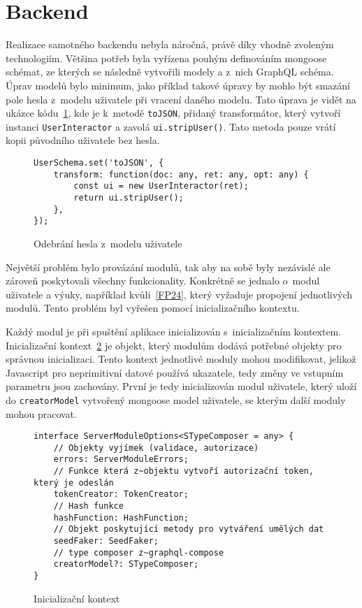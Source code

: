 \section{Backend}
\label{sc:backend}
Realizace samotného backendu nebyla náročná, právě díky vhodně zvoleným technologiím. Většina potřeb byla vyřízena pouhým definováním mongoose schémat, ze kterých se následně vytvořili modely a z~nich GraphQL schéma. Úprav modelů bylo minimum, jako příklad takové úpravy by mohlo být smazání pole hesla z~modelu uživatele při vracení daného modelu. Tato úprava je vidět na ukázce kódu~\ref{code:to_json_user}, kde je k~metodě \texttt{toJSON}, přidaný transformátor, který vytvoří instanci \texttt{UserInteractor} a zavolá \texttt{ui.stripUser()}. Tato metoda pouze vrátí kopii původního uživatele bez hesla.

\begin{figure}[h!]
    \centering
    \begin{verbatim}
UserSchema.set('toJSON', {
    transform: function(doc: any, ret: any, opt: any) {
        const ui = new UserInteractor(ret);
        return ui.stripUser();
    },
});
    \end{verbatim}
    \caption{Odebrání hesla z~modelu uživatele}
    \label{code:to_json_user}
\end{figure}

Největší problém bylo provázání modulů, tak aby na sobě byly nezávislé ale zároveň poskytovali všechny funkcionality. Konkrétně se jednalo o~modul uživatele a výuky, například kvůli~\ref{FP24}, který vyžaduje propojení jednotlivých modulů. Tento problém byl vyřešen pomocí inicializačního kontextu.

Každý modul je při spuštění aplikace inicializován s~inicializačním kontextem. Inicializační kontext~\ref{code:server_module_options} je objekt, který modulům dodává potřebné objekty pro správnou inicializaci. Tento kontext jednotlivé moduly mohou modifikovat, jelikož Javascript pro neprimitivní datové používá ukazatele, tedy změny ve vstupním parametru jsou zachovány. První je tedy inicializován modul uživatele, který uloží do \texttt{creatorModel} vytvořený mongoose model uživatele, se kterým další moduly mohou pracovat.

\begin{figure}[h!]
    \centering
    \begin{verbatim}
interface ServerModuleOptions<STypeComposer = any> {
    // Objekty vyjímek (validace, autorizace)
    errors: ServerModuleErrors;
    // Funkce která z~objektu vytvoří autorizační token, který je odeslán
    tokenCreator: TokenCreator;
    // Hash funkce
    hashFunction: HashFunction; 
    // Objekt poskytující metody pro vytváření umělých dat
    seedFaker: SeedFaker;
    // type composer z~graphql-compose
    creatorModel?: STypeComposer; 
}
    \end{verbatim}
    \caption{Inicializační kontext}
    \label{code:server_module_options}
\end{figure}

